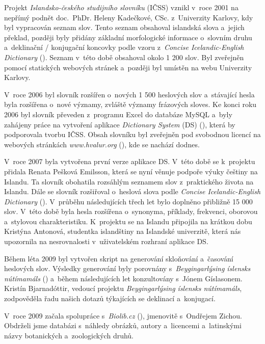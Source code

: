Projekt \textit{Islandsko-českého studijního slovníku} (IČSS) vznikl v~roce 2001 na nepřímý podnět doc. PhDr. Heleny Kadečkové, CSc. z~Univerzity Karlovy,
kdy byl vypracován seznam slov. 
Tento seznam obsahoval islandská slova a~jejich překlad, později byly přidány základní morfologické informace o~slovním druhu a~deklinační / konjugační koncovky podle vzoru z~\textit{Concise Icelandic-English Dictionary} (\cite {ic_en}). 
Seznam v~této době obsahoval okolo 1 200 slov. Byl zveřejněn pomocí statických webových stránek a~později byl umístěn na webu Univerzity Karlovy. 

V~roce 2006 byl slovník rozšířen o~nových 1 500 heslových slov a~stávající hesla byla rozšířena o~nové významy, zvláště významy frázových sloves. 
Ke konci roku 2006  byl slovník převeden z programu Excel do databáze MySQL a~byly zahájeny práce na vytvoření aplikace \textit{Dictionary System} (DS) (\cite {int19}), která by podporovala tvorbu IČSS. 
Obsah slovníku byl zveřejněn pod svobodnou licencí na webových stránkách \textit{www.hvalur.org} (\cite {int14}), kde se nachází dodnes. 

V~roce 2007 byla vytvořena první verze aplikace DS. V~této době se k~projektu přidala Renata Pešková Emilsson, která se nyní věnuje podpoře výuky češtiny na Islandu. 
Ta slovník obohatila rozsáhlým seznamem slov z~praktického života na Islandu. Dále se slovník rozšiřoval o~heslová slova podle \textit{Concise Icelandic-English Dictionary} (\cite {ic_en}). 
V průběhu následujících třech let bylo doplněno přibližně 15 000 slov. V této době byla hesla rozšířena o~synonyma, příklady, frekvenci, oborovou a~stylovou charakteristiku. K projektu se na Islandu připojila na krátkou dobu Kristýna Antonová, studentka islandštiny na Islandské univerzitě, která 
nás upozornila na nesrovnalosti v~uživatelském rozhraní aplikace DS.

Během léta 2009 byl vytvořen skript na generování skloňování a~časování heslových slov. Výsledky generování byly porovnány s~\textit{Beygingarlýsing íslensks nútímamáls} (\cite {DalvikVM}) a~během následujících let konzultovány
s~Jónem Gíslasonem. Kristín Bjarnadóttir, vedoucí projektu \textit{Beygingarlýsing íslensks nútímamáls}, zodpověděla řadu našich dotazů týkajících se deklinací a~konjugací.

V~roce 2009 začala spolupráce s~\textit{Biolib.cz} (\cite {int5}), jmenovitě s~Ondřejem Zichou. Obdrželi jsme  databázi s~náhledy obrázků, autory a~licencemi a~latinskými názvy botanických a~zoologických druhů.

